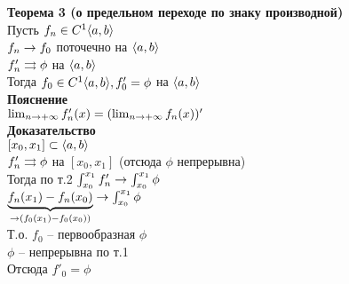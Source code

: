 \documentclass[12pt]{article}
\begin{document}
\textbf{Теорема 3 (о предельном переходе по знаку производной)}\\
Пусть $f_n \in C^1\an ab$\\
$f_n \rto f_0$ поточечно на $\an ab$\\
$f'_n \rrto \phi$ на $\an ab$\\
Тогда $f_0 \in C^1\an ab, f'_0 = \phi$ на $\an ab$\\
\textbf{Пояснение}\\
$\lim_{n\rto +\infty} f'_n(x) = (\lim_{n\rto +\infty} f_n(x))'$\\
\textbf{Доказательство}\\
$[x_0, x_1] \subset \an ab$\\
$f'_n \rrto \phi$ на $[x_0, x_1]$ (отсюда $\phi$ непрерывна)\\
Тогда по т.2 $\int_{x_0}^{x_1} f'_n \rto \int_{x_0}^{x_1} \phi$\\
$\ub{\rto (f_0(x_1)-f_0(x_0))}{f_n(x_1)-f_n(x_0)} \rto \int_{x_0}^{x_1} \phi$\\
Т.о. $f_0$ -- первообразная $\phi$\\
$\phi$ -- непрерывна по т.1\\
Отсюда $f'_0 = \phi$
\end{document}
